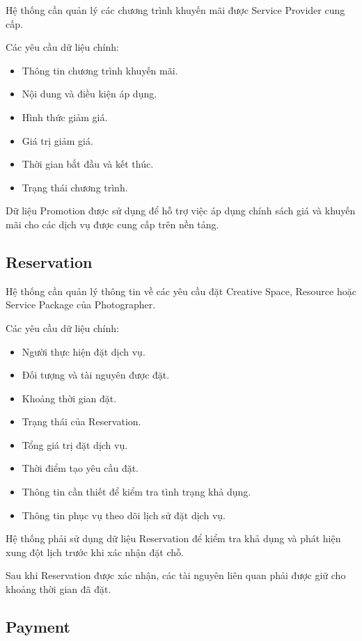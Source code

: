 Hệ thống cần quản lý các chương trình khuyến mãi được Service Provider cung cấp.

Các yêu cầu dữ liệu chính:

\begin{itemize}
\item Thông tin chương trình khuyến mãi.
\item Nội dung và điều kiện áp dụng.
\item Hình thức giảm giá.
\item Giá trị giảm giá.
\item Thời gian bắt đầu và kết thúc.
\item Trạng thái chương trình.
\end{itemize}

Dữ liệu Promotion được sử dụng để hỗ trợ việc áp dụng chính sách giá và khuyến mãi cho các dịch vụ được cung cấp trên nền tảng.

\subsection{Reservation}

Hệ thống cần quản lý thông tin về các yêu cầu đặt Creative Space, Resource hoặc Service Package của Photographer.

Các yêu cầu dữ liệu chính:

\begin{itemize}
\item Người thực hiện đặt dịch vụ.
\item Đối tượng và tài nguyên được đặt.
\item Khoảng thời gian đặt.
\item Trạng thái của Reservation.
\item Tổng giá trị đặt dịch vụ.
\item Thời điểm tạo yêu cầu đặt.
\item Thông tin cần thiết để kiểm tra tình trạng khả dụng.
\item Thông tin phục vụ theo dõi lịch sử đặt dịch vụ.
\end{itemize}

Hệ thống phải sử dụng dữ liệu Reservation để kiểm tra khả dụng và phát hiện xung đột lịch trước khi xác nhận đặt chỗ.

Sau khi Reservation được xác nhận, các tài nguyên liên quan phải được giữ cho khoảng thời gian đã đặt.

\subsection{Payment}

